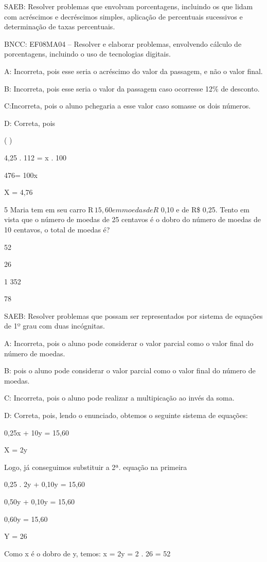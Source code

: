 {SAEB: Resolver problemas que envolvam porcentagens, incluindo os que
lidam com acréscimos e decréscimos simples, aplicação de percentuais
sucessivos e determinação de taxas percentuais.

BNCC: EF08MA04 -- Resolver e elaborar problemas, envolvendo cálculo de
porcentagens, incluindo o uso de tecnologias digitais.

A: Incorreta, pois esse seria o acréscimo do valor da passagem, e não o
valor final.

B: Incorreta, pois esse seria o valor da passagem caso ocorresse 12\% de
desconto.

C:Incorreta, pois o aluno pchegaria a esse valor caso somasse os dois
números.

D: Correta, pois

( \times {})

4,25 . 112 = x . 100

476= 100x

X = 4,76

\num{5} Maria tem em seu carro R$\,15,60 em moedas de R$ 0,10 e de R\$ 0,25.
Tento em vista que o número de moedas de 25 centavos é o dobro do número
de moedas de 10 centavos, o total de moedas é?
\item 52
\item 26
\item 1 352
\item 78

SAEB: Resolver problemas que possam ser representados por sistema de
equações de 1º grau com duas incógnitas.

A: Incorreta, pois o aluno pode considerar o valor parcial como o valor
final do número de moedas.

B: pois o aluno pode considerar o valor parcial como o valor final do
número de moedas.

C: Incorreta, pois o aluno pode realizar a multipicação ao invés da
soma.

D: Correta, pois, lendo o enunciado, obtemos o seguinte sistema de
equações:

0,25x + 10y = 15,60

X = 2y

Logo, já conseguimos substituir a 2ª. equação na primeira

0,25 . 2y + 0,10y = 15,60

0,50y + 0,10y = 15,60

0,60y = 15,60

Y = 26

Como x é o dobro de y, temos: x = 2y = 2 . 26 = 52

}
